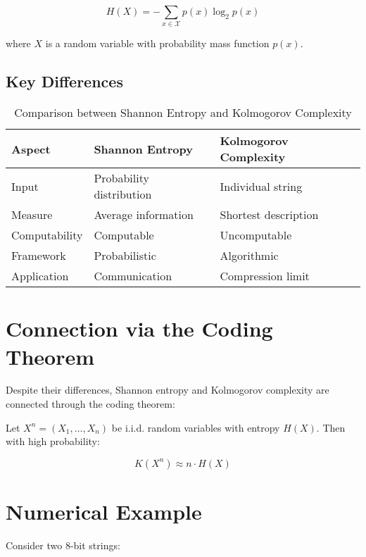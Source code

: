 \documentclass[12pt,a4paper]{report}
\begin{document}
\begin{equation}
H(X) = -\sum_{x \in \mathcal{X}} p(x) \log_2 p(x)
\end{equation}

where $X$ is a random variable with probability mass function $p(x)$.

\subsection{Key Differences}

\begin{table}[h]
\centering
\caption{Comparison between Shannon Entropy and Kolmogorov Complexity}
\begin{tabular}{lll}
\toprule
\textbf{Aspect} & \textbf{Shannon Entropy} & \textbf{Kolmogorov Complexity} \\
\midrule
Input & Probability distribution & Individual string \\
Measure & Average information & Shortest description \\
Computability & Computable & Uncomputable \\
Framework & Probabilistic & Algorithmic \\
Application & Communication & Compression limit \\
\bottomrule
\end{tabular}
\end{table}

\section{Connection via the Coding Theorem}

Despite their differences, Shannon entropy and Kolmogorov complexity are connected through the coding theorem:

\begin{theorem}
Let $X^n = (X_1, ..., X_n)$ be i.i.d. random variables with entropy $H(X)$. Then with high probability:

\begin{equation}
K(X^n) \approx n \cdot H(X)
\end{equation}
\end{theorem}

\section{Numerical Example}

Consider two 8-bit strings:
\end{document}
